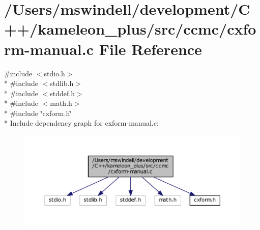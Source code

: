 \hypertarget{cxform-manual_8c}{\section{/\-Users/mswindell/development/\-C++/kameleon\-\_\-plus/src/ccmc/cxform-\/manual.c File Reference}
\label{cxform-manual_8c}
}
{\ttfamily \#include $<$stdio.\-h$>$}\\*
{\ttfamily \#include $<$stdlib.\-h$>$}\\*
{\ttfamily \#include $<$stddef.\-h$>$}\\*
{\ttfamily \#include $<$math.\-h$>$}\\*
{\ttfamily \#include \char`\"{}cxform.\-h\char`\"{}}\\*
Include dependency graph for cxform-\/manual.c\-:
\nopagebreak
\begin{figure}[H]
\begin{center}
\leavevmode
\includegraphics[width=350pt]{cxform-manual_8c__incl}
\end{center}
\end{figure}

